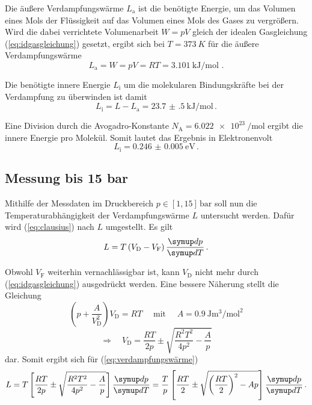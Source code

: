 Die äußere Verdampfungswärme $L_\text{a}$ ist die benötigte Energie, 
um das Volumen eines Mols der Flüssigkeit auf das Volumen eines Mols des Gases zu vergrößern.
Wird die dabei verrichtete Volumenarbeit $W = pV$  gleich der idealen Gasgleichung (\ref{eq:idgasgleichung})
gesetzt, ergibt sich bei $T = \qty{373}{K}$ für die äußere Verdampfungswärme
\begin{equation}
    L_{\text{a}} = W = pV = RT = \qty{3.101}{\kilo\joule\per\mol} \text{ .}
\end{equation}

Die benötigte innere Energie $L_\text{i}$ um die molekularen Bindungskräfte bei der Verdampfung zu überwinden ist damit
\begin{equation}
    L_{\mathrm{i}} = L-L_{\mathrm{a}} = \qty{23.7(5)}{\kilo\joule\per\mol} \, .
\end{equation}

Eine Division durch die Avogadro-Konstante $N_\text{A} = \qty{6.022e23}{\per\mol}$
ergibt die innere Energie pro Molekül. Somit lautet das Ergebnis in Elektronenvolt
\begin{equation}
    L_{\text{i}} = \qty{0.246(5)}{\eV} \, .
\end{equation}


\subsection{Messung bis 15 bar}

Mithilfe der Messdaten im Druckbereich $p \in [1, 15] \, \mathrm{bar}$ soll nun die Temperaturabhängigkeit
der Verdampfungswärme $L$ untersucht werden. Dafür wird (\ref{eq:clausius}) nach $L$ umgestellt. Es gilt
\begin{equation}
    L = T \left(V_{\text{D}} - V_{\text{F}}\right) \frac {\dif{p}} {\dif{T}} \, . \label{eq:verdampfungswärme}
\end{equation}

Obwohl $V_\text{F}$ weiterhin vernachlässigbar ist, kann $V_\text{D}$ nicht mehr durch (\ref{eq:idgasgleichung})
ausgedrückt werden.
Eine bessere Näherung stellt die Gleichung
\begin{equation}
    \left(p + \frac {A} {V_{\text{D}}^{2}}\right) V_{\text{D}} = RT 
    \quad \text { mit } \quad
    A = \qty[per-mode=fraction]{0.9}{\joule\m\cubed\per\mol\squared} 
\end{equation}
\begin{equation}
    \Rightarrow \quad V_{\text{D}} = \frac{RT}{2p} \pm \sqrt{ \frac {R^{2} T^{2}} {4 p^{2}} - \frac{A}{p} } 
\end{equation}
dar. Somit ergibt sich für (\ref{eq:verdampfungswärme}) 
\begin{equation}
    L = T\left[\frac{R T}{2 p} \pm \sqrt{\frac{R^{2} T^{2}}{4 p^{2}}-\frac{A}{p}}\right] \frac{\dif{p}}{\dif{T}} 
    = \frac{T}{p} \left[\frac{R T}{2} \pm \sqrt{\left(\frac{R T}{2}\right)^{2}-A p}\right] \frac{\dif{p}}{\dif{T}} \, .
    \label{eq:L}
\end{equation}

